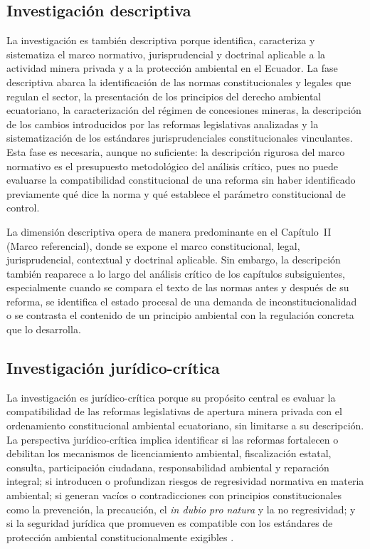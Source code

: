 \subsection{Investigación descriptiva}

La investigación es también descriptiva porque identifica, caracteriza y sistematiza el marco normativo, jurisprudencial y doctrinal aplicable a la actividad minera privada y a la protección ambiental en el Ecuador. La fase descriptiva abarca la identificación de las normas constitucionales y legales que regulan el sector, la presentación de los principios del derecho ambiental ecuatoriano, la caracterización del régimen de concesiones mineras, la descripción de los cambios introducidos por las reformas legislativas analizadas y la sistematización de los estándares jurisprudenciales constitucionales vinculantes. Esta fase es necesaria, aunque no suficiente: la descripción rigurosa del marco normativo es el presupuesto metodológico del análisis crítico, pues no puede evaluarse la compatibilidad constitucional de una reforma sin haber identificado previamente qué dice la norma y qué establece el parámetro constitucional de control.

La dimensión descriptiva opera de manera predominante en el Capítulo~II (Marco referencial), donde se expone el marco constitucional, legal, jurisprudencial, contextual y doctrinal aplicable. Sin embargo, la descripción también reaparece a lo largo del análisis crítico de los capítulos subsiguientes, especialmente cuando se compara el texto de las normas antes y después de su reforma, se identifica el estado procesal de una demanda de inconstitucionalidad o se contrasta el contenido de un principio ambiental con la regulación concreta que lo desarrolla.

\subsection{Investigación jurídico-crítica}

La investigación es jurídico-crítica porque su propósito central es evaluar la compatibilidad de las reformas legislativas de apertura minera privada con el ordenamiento constitucional ambiental ecuatoriano, sin limitarse a su descripción. La perspectiva jurídico-crítica implica identificar si las reformas fortalecen o debilitan los mecanismos de licenciamiento ambiental, fiscalización estatal, consulta, participación ciudadana, responsabilidad ambiental y reparación integral; si introducen o profundizan riesgos de regresividad normativa en materia ambiental; si generan vacíos o contradicciones con principios constitucionales como la prevención, la precaución, el \textit{in dubio pro natura} y la no regresividad; y si la seguridad jurídica que promueven es compatible con los estándares de protección ambiental constitucionalmente exigibles \parencite{lozano_espinosa_2023}.

